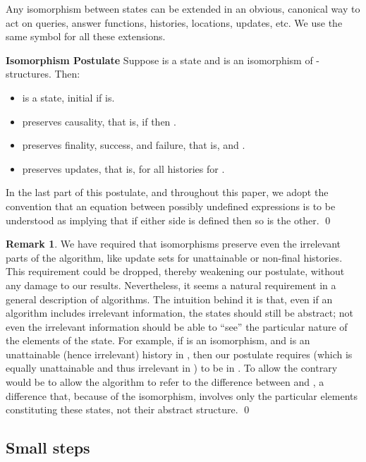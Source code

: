 \documentclass{LMCS}
\theoremstyle{definition}
\newtheorem{rmk}[thm]{Remark}
\newenvironment{ls}{\begin{itemize}}{\end{itemize}}
\newenvironment{unn}[1]{\bigskip\noindent\textbf{#1}\quad}{\par\bigskip}
\begin{document}
Any isomorphism  between states can be extended in an
obvious, canonical way to act on queries, answer functions, histories,
locations, updates, etc.  We use the same symbol  for all these
extensions.

\begin{unn}{Isomorphism Postulate}
Suppose  is a state and  is an isomorphism of
-structures.  Then:
\begin{ls}
  \item  is a state, initial if  is.
  \item  preserves causality, that is, if  then
  .
  \item  preserves finality, success, and failure, that is,  and .
  \item  preserves updates, that is, 
  for all histories  for .
\end{ls}
\end{unn}

\begin{conv}
  In the last part of this postulate, and throughout this paper, we
  adopt the convention that an equation between possibly undefined
  expressions is to be understood as implying that if either side is
  defined then so is the other.
\qed\end{conv}

\begin{rmk}
  We have required that isomorphisms preserve even the irrelevant
  parts of the algorithm, like update sets for unattainable or
  non-final histories.  This requirement could be dropped, thereby
  weakening our postulate, without any damage to our results.
  Nevertheless, it seems a natural requirement in a general
  description of algorithms.  The intuition behind it is that, even if
  an algorithm includes irrelevant information, the states should
  still be abstract; not even the irrelevant information should be
  able to ``see'' the particular nature of the elements of the state.
  For example, if  is an isomorphism, and  is an
  unattainable (hence irrelevant) history in , then our
  postulate requires  (which is equally unattainable and thus
  irrelevant in ) to be in .  To allow the contrary would
  be to allow the algorithm to refer to the difference between  and
  , a difference that, because of the isomorphism, involves only the
  particular elements constituting these states, not their abstract
  structure. 
  \qed\end{rmk}

\subsection{Small steps}
\end{document}
